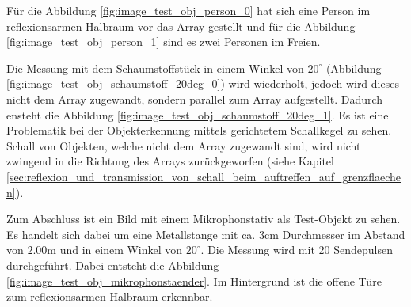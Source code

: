 Für die Abbildung \ref{fig:image_test_obj_person_0} hat sich eine Person im reflexionsarmen Halbraum vor das Array gestellt und für die Abbildung \ref{fig:image_test_obj_person_1} sind es zwei Personen im Freien.

Die Messung mit dem Schaumstoffstück in einem Winkel von $20^{\circ}$ (Abbildung \ref{fig:image_test_obj_schaumstoff_20deg_0}) wird wiederholt, jedoch wird dieses nicht dem Array zugewandt, sondern parallel zum Array aufgestellt. Dadurch ensteht die Abbildung \ref{fig:image_test_obj_schaumstoff_20deg_1}. Es ist eine Problematik bei der Objekterkennung mittels gerichtetem Schallkegel zu sehen. Schall von Objekten, welche nicht dem Array zugewandt sind, wird nicht zwingend in die Richtung des Arrays zurückgeworfen (siehe Kapitel \ref{sec:reflexion_und_transmission_von_schall_beim_auftreffen_auf_grenzflaechen}).

Zum Abschluss ist ein Bild mit einem Mikrophonstativ als Test-Objekt zu sehen. Es handelt sich dabei um eine Metallstange mit ca. $3 \mathrm{cm}$ Durchmesser im Abstand von $2.00 \mathrm{m}$ und in einem Winkel von $20^{\circ}$. Die Messung wird mit 20 Sendepulsen durchgeführt. Dabei entsteht die Abbildung \ref{fig:image_test_obj_mikrophonstaender}. Im Hintergrund ist die offene Türe zum reflexionsarmen Halbraum erkennbar.

